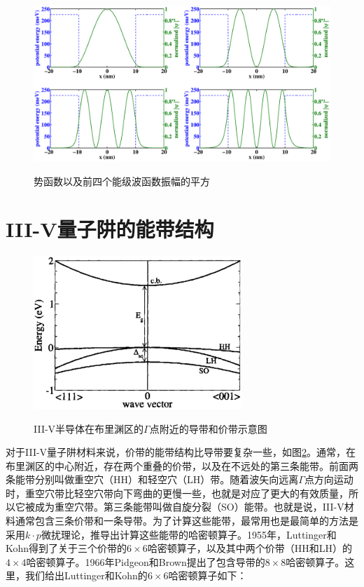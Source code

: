 \documentclass{ZJUthesis}
\begin{document}
\begin{figure}[!ht]
  \centering
  \includegraphics[width=1.0\textwidth]{./Pictures/waves.eps}\\
  \caption{势函数以及前四个能级波函数振幅的平方}
  \label{fig_waves}
\end{figure}

\section{III-V量子阱的能带结构}

\begin{figure}[!ht]
  \centering
  \includegraphics[width=0.7\textwidth]{./Pictures/bands.eps}\\
  \caption{III-V半导体在布里渊区的$\Gamma$点附近的导带和价带示意图}
  \label{fig_bands}
\end{figure}

对于III-V量子阱材料来说，价带的能带结构比导带要复杂一些，如图\ref{fig_bands}。通常，在布里渊区的中心附近，存在两个重叠的价带，以及在不远处的第三条能带。前面两条能带分别叫做重空穴（HH）和轻空穴（LH）带。随着波矢向远离$\Gamma$点方向运动时，重空穴带比轻空穴带向下弯曲的更慢一些，也就是对应了更大的有效质量，所以它被成为重空穴带。第三条能带叫做自旋分裂（SO）能带。也就是说，III-V材料通常包含三条价带和一条导带。为了计算这些能带，最常用也是最简单的方法是采用$k\cdot p$微扰理论，推导出计算这些能带的哈密顿算子。1955年，Luttinger和Kohn得到了关于三个价带的$6\times6$哈密顿算子，以及其中两个价带（HH和LH）的$4\times4$哈密顿算子\cite{Luttinger1955Motion}。1966年Pidgeon和Brown提出了包含导带的$8\times8$哈密顿算子\cite{Pidgeon1966Interband}。这里，我们给出Luttinger和Kohn的$6\times6$哈密顿算子如下：
\end{document}
